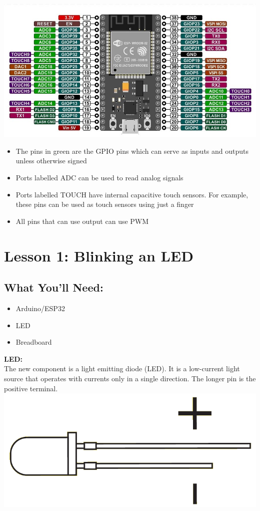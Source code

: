 \documentclass[a4paper,12pt]{report}
\begin{document}
\newpage
\begin{center}
    \includegraphics[scale = 2]{Assets/Esp_pinout.jpg}
    \begin{itemize}
        \item The pins in green are the GPIO pins which can serve as inputs and outputs unless otherwise signed
        \item Ports labelled ADC can be used to read analog signals
        \item Ports labelled TOUCH have internal capacitive touch sensors. For example, these pins can be used as touch sensors using just a finger
        \item All pins that can use output can use PWM
    \end{itemize}
\end{center}

\newpage
\section*{Lesson 1: Blinking an LED}
    \subsection*{What You'll Need:}
        \begin{itemize}
            \item Arduino/ESP32
            \item LED
            \item Breadboard
        \end{itemize}
        \begin{mdframed}[linewidth = 3, linecolor = turbo_purple]
        \textbf{LED:}
        \\
        The new component is a light emitting diode (LED). It is a low-current light source that operates with currents only in a single direction. The longer pin is the positive terminal.
        \includegraphics[scale = 0.3]{Assets/led.png}
        \end{mdframed}
\end{document}
